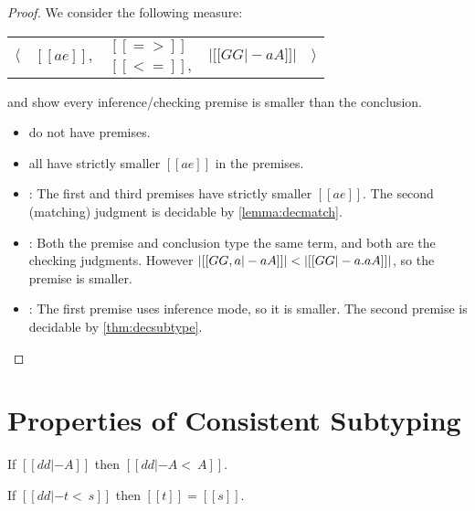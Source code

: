 \dectyping*
\begin{proof}

  We consider the following measure:
  \begin{center}
    \begin{tabular}{lllll}
      \multirow{2}{*}{$ \Big \langle$} & \multirow{2}{*}{$[[ae]],$} & $[[=>]]$ & \multirow{2}{*}{$| [[GG |- aA]] |$} & \multirow{2}{*}{$\Big \rangle$} \\
                                       &                    & $[[<=]],$ &  &
    \end{tabular}
  \end{center}
  and show every inference/checking premise is smaller than the conclusion.
  \begin{itemize}
  \item {} do not have premises.
  \item {} all have strictly
    smaller $[[ae]]$ in the premises.
  \item {}: The first and third premises have strictly smaller
    $[[ae]]$. The second (matching) judgment is decidable by
    \cref{lemma:decmatch}.
  \item {}: Both the premise and conclusion type the same term, and
    both are the checking judgments. However $| [[GG, a |- aA]] | < | [[GG |-  \/a. aA]] |$, so
    the premise is smaller.
  \item {}: The first premise uses inference mode, so it is smaller.
    The second premise is decidable by \cref{thm:decsubtype}.
  \end{itemize}

\end{proof}

\newpage



\section{Properties of Consistent Subtyping}


\begin{clemma} \label{lemma:sub_refl}%
  If $[[ dd |- A  ]]$ then $[[ dd |- A <~ A  ]]$.
\end{clemma}


\begin{clemma}   \label{lemma:mono_equal}
  If  $[[ dd |- t <~ s  ]]$  then $[[t]] = [[s]]$.
\end{clemma}

